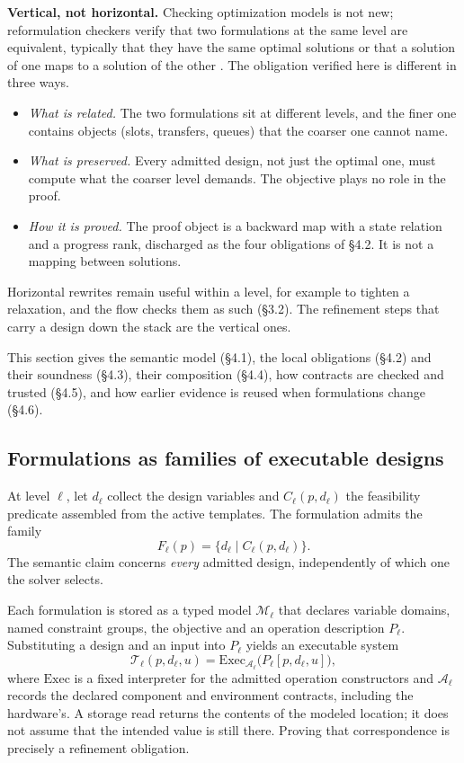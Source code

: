 \documentclass[11pt]{article}
\providecommand{\tightlist}{\setlength{\itemsep}{0pt}\setlength{\parskip}{0pt}}
\begin{document}
\textbf{Vertical, not horizontal.} Checking optimization models is not new; reformulation checkers verify that two formulations at the same level are equivalent, typically that they have the same optimal solutions or that a solution of one maps to a solution of the other \cite{r11,r13,r14}. The obligation verified here is different in three ways.

\begin{itemize}
\tightlist
\item
  \emph{What is related.} The two formulations sit at different levels, and the finer one contains objects (slots, transfers, queues) that the coarser one cannot name.
\item
  \emph{What is preserved.} Every admitted design, not just the optimal one, must compute what the coarser level demands. The objective plays no role in the proof.
\item
  \emph{How it is proved.} The proof object is a backward map with a state relation and a progress rank, discharged as the four obligations of §4.2. It is not a mapping between solutions.
\end{itemize}

Horizontal rewrites remain useful within a level, for example to tighten a relaxation, and the flow checks them as such (§3.2). The refinement steps that carry a design down the stack are the vertical ones.

This section gives the semantic model (§4.1), the local obligations (§4.2) and their soundness (§4.3), their composition (§4.4), how contracts are checked and trusted (§4.5), and how earlier evidence is reused when formulations change (§4.6).

\hypertarget{formulations-as-families-of-executable-designs}{%
\subsection{Formulations as families of executable designs}\label{formulations-as-families-of-executable-designs}}

At level \(\ell\), let \(d_\ell\) collect the design variables and \(C_\ell(p,d_\ell)\) the feasibility predicate assembled from the active templates. The formulation admits the family
\[
F_\ell(p)=\{d_\ell \mid C_\ell(p,d_\ell)\}.
\]
The semantic claim concerns \emph{every} admitted design, independently of which one the solver selects.

Each formulation is stored as a typed model \(\mathcal M_\ell\) that declares variable domains, named constraint groups, the objective and an operation description \(P_\ell\). Substituting a design and an input into \(P_\ell\) yields an executable system
\[
\mathcal T_\ell(p,d_\ell,u)=\mathrm{Exec}_{\mathcal A_\ell}\bigl(P_\ell[p,d_\ell,u]\bigr),
\]
where \(\mathrm{Exec}\) is a fixed interpreter for the admitted operation constructors and \(\mathcal A_\ell\) records the declared component and environment contracts, including the hardware's. A storage read returns the contents of the modeled location; it does not assume that the intended value is still there. Proving that correspondence is precisely a refinement obligation.
\end{document}
